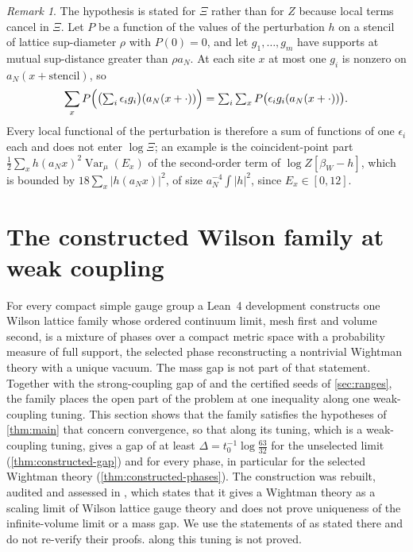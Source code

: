 \documentclass[11pt,a4paper]{amsart}
\theoremstyle{definition}
\theoremstyle{remark}
\newtheorem{remark}[theorem]{Remark}
\numberwithin{equation}{section}
\DeclareMathOperator{\Var}{Var}      %
\newcommand{\abs}[1]{\lvert #1\rvert}      %
\newcommand{\Mcirc}{\text{\upshape(M$^{\circ}$)}}   %
\newcommand{\aN}{a_N}                      %
\newcommand{\tzero}{t_0}                   %
\newcommand{\betaW}{\beta_{W}}             %
\begin{document}
\begin{remark}
The hypothesis is stated for $\Xi$ rather than for $Z$ because local terms cancel in $\Xi$. Let $P$ be a function of the values of the perturbation $h$ on a stencil of lattice sup-diameter $\rho$ with $P(0)=0$, and let $g_1,\dots,g_m$ have supports at mutual sup-distance greater than $\rho\aN$. At each site $x$ at most one $g_i$ is nonzero on $\aN(x+\text{stencil})$, so
\[
\sum_xP\Bigl(\bigl(\textstyle\sum_i\epsilon_ig_i\bigr)(\aN(x+\cdot))\Bigr)=\sum_i\sum_xP\bigl(\epsilon_ig_i(\aN(x+\cdot))\bigr).
\]
Every local functional of the perturbation is therefore a sum of functions of one $\epsilon_i$ each and does not enter $\log\Xi$; an example is the coincident-point part $\frac12\sum_xh(\aN x)^2\Var_\mu(E_x)$ of the second-order term of $\log Z[\betaW-h]$, which is bounded by $18\sum_x\abs{h(\aN x)}^2$, of size $\aN^{-4}\int\abs{h}^2$, since $E_x\in[0,12]$.
\end{remark}
\section{The constructed Wilson family at weak coupling}\label{sec:constructed}

For every compact simple gauge group a Lean~4 development \cite{openaiym} constructs one Wilson lattice family whose ordered continuum limit, mesh first and volume second, is a mixture of phases over a compact metric space with a probability measure of full support, the selected phase reconstructing a nontrivial Wightman theory with a unique vacuum. The mass gap is not part of that statement. Together with the strong-coupling gap of \cite[Theorem~A]{bhattacharjee2026first} and the certified seeds of \cref{sec:ranges}, the family places the open part of the problem at one inequality along one weak-coupling tuning. This section shows that the family satisfies the hypotheses of \cref{thm:main} that concern convergence, so that \Mcirc{} along its tuning, which is a weak-coupling tuning, gives a gap of at least $\Delta=\tzero^{-1}\log\frac{63}{32}$ for the unselected limit (\cref{thm:constructed-gap}) and for every phase, in particular for the selected Wightman theory (\cref{thm:constructed-phases}). The construction was rebuilt, audited and assessed in \cite{ymgroup2026}, which states that it gives a Wightman theory as a scaling limit of Wilson lattice gauge theory and does not prove uniqueness of the infinite-volume limit or a mass gap. We use the statements of \cite{openaiym,ymgroup2026} as stated there and do not re-verify their proofs. \Mcirc{} along this tuning is not proved.
\end{document}
